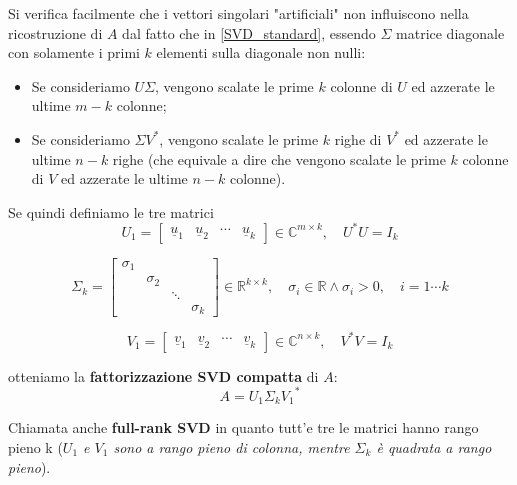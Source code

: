 Si verifica facilmente che i vettori singolari "artificiali" non influiscono 
nella ricostruzione di $A$ dal fatto che in \eqref{SVD_standard}, essendo 
$\Sigma$ matrice diagonale con solamente i primi $k$ elementi sulla diagonale 
non nulli:
\begin{itemize}
	\item Se consideriamo $U \Sigma$, vengono scalate le prime $k$ colonne di $U$ 
ed azzerate le ultime $m-k$ colonne;
	
	\item Se consideriamo $\Sigma V^*$, vengono scalate le prime $k$ righe di $V^*$ 
ed azzerate le ultime $n-k$ righe (che equivale a dire che vengono scalate le 
prime $k$ colonne di $V$ ed azzerate le ultime $n-k$ colonne).
\end{itemize}

Se quindi definiamo le tre matrici
\begin{equation*}  
U_{1} = \begin{bmatrix}
\underline{u}_1 & \underline{u}_2 & \cdots & \underline{u}_k
\end{bmatrix}
\in \mathbb{C}^{m \times k},
\quad U^*U = I_k
\end{equation*}

\begin{equation*}  
\Sigma_{k} = \begin{bmatrix}
\sigma_1 & & & \\
& \sigma_2 & & \\
& & \ddots & \\
& & & \sigma_k
\end{bmatrix} \in \mathbb{R}^{k \times k},
\quad \sigma_i \in \mathbb{R} \wedge \sigma_i > 0, \quad i = 1 \cdots k
\end{equation*}

\begin{equation*}  
V_{1} = \begin{bmatrix}
\underline{v}_1 & \underline{v}_2 & \cdots & \underline{v}_k
\end{bmatrix}
\in \mathbb{C}^{n \times k},
\quad V^*V = I_k
\end{equation*}

otteniamo la \textbf{fattorizzazione SVD compatta} di $A$:
\begin{equation}\label{SVD_compact}
A = U_1 \Sigma_k {V_1}^*
\end{equation}

Chiamata anche \textbf{full-rank SVD} in quanto tutt'e tre le matrici hanno 
rango pieno k (\textit{$U_1$ e $V_1$ sono a rango pieno di colonna, mentre 
$\Sigma_k$ è quadrata a rango pieno}).


